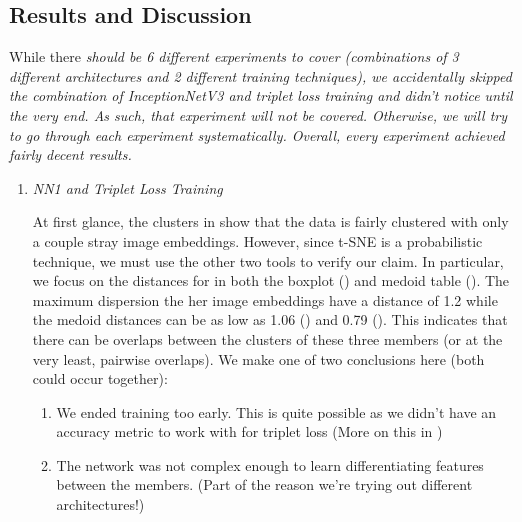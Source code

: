 \subsection{Results and Discussion}\label{Section:Face-Recognition:Results}

While there \it{should} be 6 different experiments to cover (combinations of 3 different architectures and 2 different training techniques), we accidentally skipped the combination of \it{InceptionNetV3 and triplet loss training} and didn't notice until the very end.
As such, that experiment will not be covered. 
Otherwise, we will try to go through each experiment systematically.
Overall, every experiment achieved fairly decent results.

\begin{enumerate}[left=0pt]
\item \it{NN1 and Triplet Loss Training}

At first glance, the clusters in  show that the data is fairly clustered with only a couple stray image embeddings.
However, since t-SNE is a probabilistic technique, we must use the other two tools to verify our claim.
In particular, we focus on the distances for \Eunbi in both the boxplot () and medoid table ().
The maximum dispersion the her image embeddings have a distance of 1.2 while the medoid distances can be as low as 1.06 (\Chaeyeon) and 0.79 (\Minju).
This indicates that there can be overlaps between the clusters of these three members (or at the very least, pairwise overlaps).
We make one of two conclusions here (both could occur together):
\begin{enumerate}
    \item We ended training too early.
    This is quite possible as we didn't have an accuracy metric to work with for triplet loss (More on this in )
    
    \item The network was not complex enough to learn differentiating features between the members. (Part of the reason we're trying out different architectures!)
\end{enumerate}


\end{enumerate}
